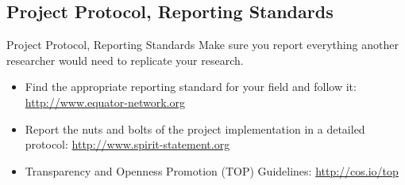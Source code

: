 \documentclass{beamer}
\begin{document}
\subsection*{Project Protocol, Reporting Standards}
\begin{frame}[<.->]{Project Protocol, Reporting Standards}
 Make sure you report everything another researcher would need to replicate your research.
 \begin{itemize}
 \item Find the appropriate reporting standard for your field and follow it: \url{http://www.equator-network.org}
\item Report the nuts and bolts of the project implementation in a detailed protocol: \url{http://www.spirit-statement.org}
\item Transparency and Openness Promotion (TOP) Guidelines: \url{http://cos.io/top}
\end{itemize}
\end{frame}

 { %
    \begin{frame}[plain, label=AEAreg]
     \end{frame}
}
\end{document}
